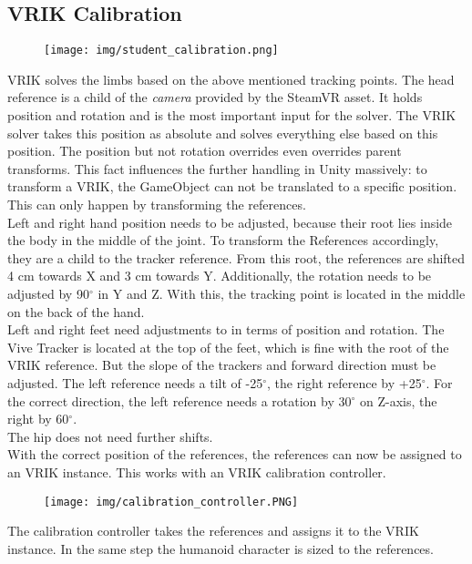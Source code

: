 \subsection{VRIK Calibration}
\begin{figure}
	\centering
	\texttt{[image: img/student\_calibration.png]}
	\caption{}
	\label{fig:student_calibration}
\end{figure}
VRIK solves the limbs based on the above mentioned tracking points. The head reference is a child of the \textit{camera} provided by the SteamVR asset. It holds position and rotation and is the most important input for the solver. The VRIK solver takes this position as absolute and solves everything else based on this position. The position but not rotation overrides even overrides parent transforms. This fact influences the further handling in Unity massively: to transform a VRIK, the GameObject can not be translated to a specific position. This can only happen by transforming the references.\\
Left and right hand position needs to be adjusted, because their root lies inside the body in the middle of the joint. To transform the References accordingly, they are a child to the tracker reference. From this root, the references are shifted 4 cm towards X and 3 cm towards Y. Additionally, the rotation needs to be adjusted by 90$^\circ$ in Y and Z. With this, the tracking point is located in the middle on the back of the hand.\\
Left and right feet need adjustments to in terms of position and rotation. The Vive Tracker is located at the top of the feet, which is fine with the root of the VRIK reference. But the slope of the trackers and forward direction must be adjusted. The left reference needs a tilt of -25$^\circ$, the right reference by +25$^\circ$. For the correct direction, the left reference needs a rotation by 30$^\circ$ on Z-axis, the right by 60$^\circ$.\\
The hip does not need further shifts.\\
With the correct position of the references, the references can now be assigned to an VRIK instance. This works with an VRIK calibration controller.
\begin{figure}
	\centering
	\texttt{[image: img/calibration\_controller.PNG]}
	\caption{}
	\label{fig:calibrationController}
\end{figure}
The calibration controller takes the references and assigns it to the VRIK instance. In the same step the humanoid character is sized to the references.
